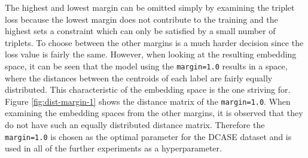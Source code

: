\newline
\newline
The highest and lowest margin can be omitted simply by examining the triplet loss because the lowest margin does not contribute to the training and the highest sets a constraint which can only be satisfied by a small number of triplets. To choose between the other margins is a much harder decision since the loss value is fairly the same. However, when looking at the resulting embedding space, it can be seen that the model using the \texttt{margin=1.0} results in a space, where the distances between the centroids of each label are fairly equally distributed. This characteristic of the embedding space is the one striving for. Figure \ref{fig:dist-margin-1} shows the distance matrix of the \texttt{margin=1.0}. When examining the embedding spaces from the other margins, it is observed that they do not have such an equally distributed distance matrix. Therefore the \texttt{margin=1.0} is chosen as the optimal parameter for the \gls{DCASE} dataset and is used in all of the further experiments as a hyperparameter.

